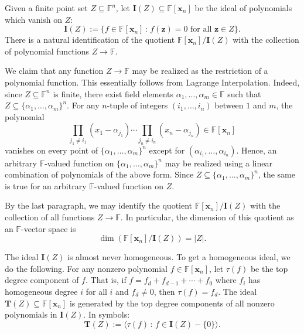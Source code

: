 \documentclass[10pt]{amsart}
\theoremstyle{definition}
\newcommand{\FF}{{\mathbb{F}}}
\newcommand{\zz}{{\mathbf {z}}}
\newcommand{\xx}{{\mathbf {x}}}
\newcommand{\II}{{\mathbf {I}}}
\newcommand{\TT}{{\mathbf {T}}}
\begin{document}
Given a finite point set $Z \subseteq \FF^n$, let $\II(Z) \subseteq \FF[\xx_n]$ be the ideal of 
polynomials which vanish on $Z$:
\begin{equation}
\II(Z) := \{ f \in \FF[\xx_n] \,:\, f(\zz) = 0 \text{ for all $\zz \in Z$} \}.
\end{equation} 
There is a natural identification of the quotient ${\FF[\xx_n]} / {\II(Z)}$ with the collection of
polynomial functions $Z \rightarrow \FF$.


We claim that any function $Z \rightarrow \FF$ may be realized as the restriction of a polynomial
function.  This essentially follows from Lagrange Interpolation.  Indeed, since $Z \subseteq \FF^n$ is finite, there exist
field elements $\alpha_1, \dots, \alpha_m \in \FF$ such that $Z \subseteq \{\alpha_1, \dots, \alpha_m\}^n$. 
For any $n$-tuple of integers $(i_1, \dots, i_n)$ between $1$ and $m$, the polynomial
\begin{equation*}
\prod_{j_1 \neq i_1} (x_1 - \alpha_{j_1}) \cdots \prod_{j_n \neq i_n} (x_n - \alpha_{j_n}) \in \FF[\xx_n]
\end{equation*} 
vanishes on every point of $\{\alpha_1, \dots, \alpha_m\}^n$ except for 
$(\alpha_{i_1}, \dots, \alpha_{i_n})$.  Hence, an arbitrary $\FF$-valued function on
$\{\alpha_1, \dots, \alpha_m\}^n$ may be realized using a linear combination of polynomials of the above form.
Since $Z \subseteq \{\alpha_1, \dots, \alpha_m\}^n$, the same is true for an arbitrary $\FF$-valued function on $Z$.

By the last paragraph, we may identify the quotient ${\FF[\xx_n]} / {\II(Z)}$ with the collection of all 
functions $Z \rightarrow \FF$.
In particular, the dimension of this quotient as an $\FF$-vector space is
\begin{equation}
\dim \left( {\FF[\xx_n]} / {\II(Z)} \right) = |Z|.
\end{equation}

The ideal $\II(Z)$ is almost never homogeneous.  To get a homogeneous ideal, we do the following.
For any nonzero polynomial $f \in \FF[\xx_n]$, let $\tau(f)$ be the top degree component of $f$.  That 
is, if $f = f_d + f_{d-1} + \cdots + f_0$ where $f_i$ has homogeneous degree $i$ for all $i$ and $f_d \neq 0$, then
$\tau(f) = f_d$.  The ideal $\TT(Z) \subseteq \FF[\xx_n]$ is generated by the top degree components of all
nonzero polynomials in $\II(Z)$.  In symbols:
\begin{equation}
\TT(Z) := \langle \tau(f) \,:\, f \in \II(Z) - \{0\} \rangle.
\end{equation}
\end{document}
